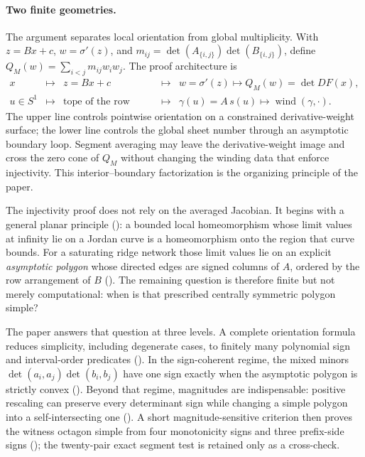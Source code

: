 \documentclass[11pt,twoside,leqno]{article}
\theoremstyle{plain}
\theoremstyle{definition}
\theoremstyle{remark}
\newcommand{\wind}{\operatorname{wind}}
\begin{document}
\paragraph{Two finite geometries.} The argument separates local orientation from global multiplicity.  With $z=Bx+c$, $w=\sigma'(z)$, and $m_{ij}=\det(A_{\{i,j\}})\det(B_{\{i,j\}})$, define $Q_M(w)=\sum_{i<j}m_{ij}w_iw_j$.  The proof architecture is
\[
\begin{array}{ccccc}
x &\longmapsto& z=Bx+c &\longmapsto&
w=\sigma'(z)\longmapsto Q_M(w)=\det DF(x),\\[3pt]
u\in S^1 &\longmapsto& \text{tope of the row arrangement}
&\longmapsto& \gamma(u)=A\,s(u)\longmapsto \wind(\gamma,\cdot).
\end{array}
\]
The upper line controls pointwise orientation on a constrained derivative-weight surface; the lower line controls the global sheet number through an asymptotic boundary loop.  Segment averaging may leave the derivative-weight image and cross the zero cone of $Q_M$ without changing the winding data that enforce injectivity.  This interior--boundary factorization is the organizing principle of the paper.

The injectivity proof does not rely on the averaged Jacobian.  It begins with a general planar principle (): a bounded local homeomorphism whose limit values at infinity lie on a Jordan curve is a homeomorphism onto the region that curve bounds.  For a saturating ridge network those limit values lie on an explicit \emph{asymptotic polygon} whose directed edges are signed columns of $A$, ordered by the row arrangement of $B$ (). The remaining question is therefore finite but not merely computational: when is that prescribed centrally symmetric polygon simple?

The paper answers that question at three levels.  A complete orientation formula reduces simplicity, including degenerate cases, to finitely many polynomial sign and interval-order predicates ().  In the sign-coherent regime, the mixed minors $\det(a_i,a_j)\det(b_i,b_j)$ have one sign exactly when the asymptotic polygon is strictly convex ().  Beyond that regime, magnitudes are indispensable: positive rescaling can preserve every determinant sign while changing a simple polygon into a self-intersecting one ().  A short magnitude-sensitive criterion then proves the witness octagon simple from four monotonicity signs and three prefix-side signs (); the twenty-pair exact segment test is retained only as a cross-check.
\end{document}
